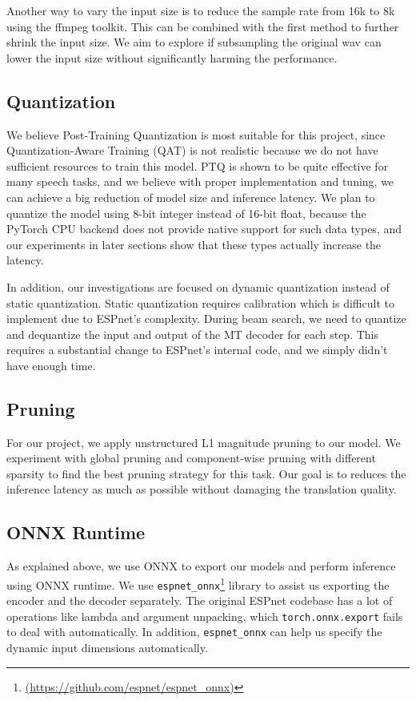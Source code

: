 \documentclass[11pt]{article}
\begin{document}
Another way to vary the input size is to reduce the sample rate from 16k to 8k using the ffmpeg toolkit. This can be combined with the first method to further shrink the input size. We aim to explore if subsampling the original wav can lower the input size without significantly harming the performance.


\subsection{Quantization}
We believe Post-Training Quantization is most suitable for this project, since Quantization-Aware Training (QAT) is not realistic because we do not have sufficient resources to train this model. 
PTQ is shown to be quite effective for many speech tasks, and we believe with proper implementation and tuning, we can achieve a big reduction of model size and inference latency.
We plan to quantize the model using 8-bit integer instead of 16-bit float, because the PyTorch CPU backend does not provide native support for such data types, and our experiments in later sections show that these types actually increase the latency.

In addition, our investigations are focused on dynamic quantization instead of static quantization.
Static quantization requires calibration which is difficult to implement due to ESPnet's complexity. During beam search, we need to quantize and dequantize the input and output of the MT decoder for each step. This requires a substantial change to ESPnet's internal code, and we simply didn't have enough time. 


\subsection{Pruning}
For our project, we apply unstructured L1 magnitude pruning to our model. We experiment with global pruning and component-wise pruning with different sparsity to find the best pruning strategy for this task. Our goal is to reduces the inference latency as much as possible without damaging the translation quality.



\subsection{ONNX Runtime}
As explained above, we use ONNX to export our models and perform inference using ONNX runtime.
We use \texttt{espnet\_onnx}\footnote{\url{(https://github.com/espnet/espnet_onnx)}} library to assist us exporting the encoder and the decoder separately. The original ESPnet codebase has a lot of operations like lambda and argument unpacking, which \texttt{torch.onnx.export} fails to deal with automatically. In addition, \texttt{espnet\_onnx} can help us specify the dynamic input dimensions automatically.
\end{document}
